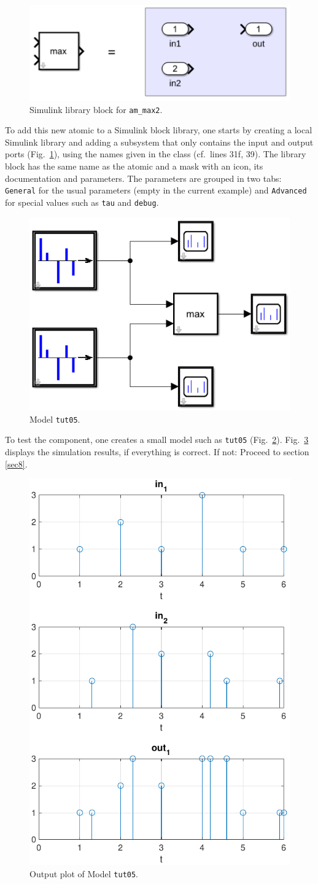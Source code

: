 \documentclass[12pt,oneside,a4paper,bibtotoc,BCOR=0pt,DIV=20]{scrreprt}
\newcommand{\cft}[1]{\mbox{\texttt{#1}}}   %
\begin{document}
\begin{figure}[ht]
\centering
\includegraphics[width=0.40\columnwidth]{images/bild12.pdf}
\caption{Simulink library block for \cft{am\_max2}.}
\label{fig_12}
\end{figure}

To add this new atomic to a Simulink block library, one starts by creating a
local Simulink library and adding a subsystem that only contains the input and
output ports (Fig.\ \ref{fig_12}), using the names given in the class
(cf.\ lines 31f, 39). The library block has the same name as the atomic and a
mask with an icon, its documentation and parameters. The parameters are grouped
in two tabs: \cft{General} for the usual parameters (empty in the current
example) and \cft{Advanced} for special values such as \cft{tau} and
\cft{debug}.

\begin{figure}[ht]
\centering
\includegraphics[width=0.33\columnwidth]{images/bild13.pdf}
\caption{Model \cft{tut05}.}
\label{fig_13}
\end{figure}

To test the component, one creates a small model such as \cft{tut05}
(Fig.\ \ref{fig_13}). Fig.\ \ref{fig_14} displays the simulation results, if
everything is correct. If not: Proceed to section \ref{sec8}.


\begin{figure}[ht]
\centering
\includegraphics[width=0.30\columnwidth]{images/bild14.pdf}
\caption{Output plot of Model \cft{tut05}.}
\label{fig_14}
\end{figure}
\end{document}
